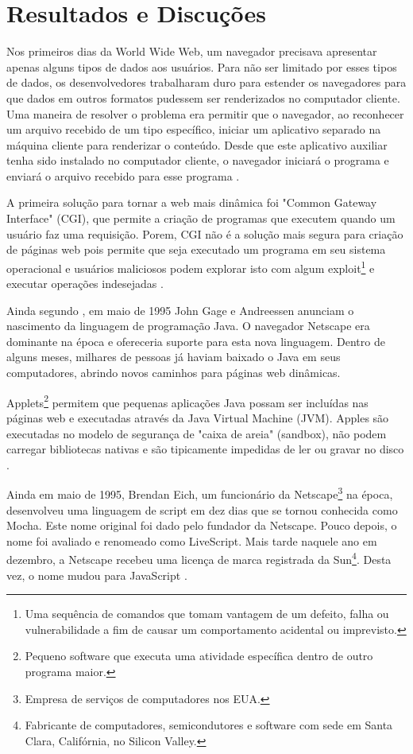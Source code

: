 \section{Resultados e Discuções}



Nos primeiros dias da World Wide Web, um navegador precisava apresentar apenas alguns tipos de dados aos usuários. Para não ser limitado por esses tipos de dados, os desenvolvedores trabalharam duro para estender os navegadores para que dados em outros formatos pudessem ser renderizados no computador cliente. Uma maneira de resolver o problema era permitir que o navegador, ao reconhecer um arquivo recebido de um tipo específico, iniciar um aplicativo separado na máquina cliente para renderizar o conteúdo. Desde que este aplicativo auxiliar tenha sido instalado no computador cliente, o navegador iniciará o programa e enviará o arquivo recebido para esse programa \citep{zammetti2007brief}.

A primeira solução para tornar a web mais dinâmica foi "Common Gateway Interface" (CGI), que permite a criação de programas que executem quando um usuário faz uma requisição. Porem, CGI não é a solução mais segura para criação de páginas web pois permite que seja executado um programa em seu sistema operacional e usuários maliciosos podem explorar isto com algum exploit\footnote{Uma sequência de comandos que tomam vantagem de um defeito, falha ou vulnerabilidade a fim de causar um comportamento acidental ou imprevisto.} e executar operações indesejadas \citep{Asleson2006}.

Ainda segundo \citet{Asleson2006}, em maio de 1995 John Gage e Andreessen anunciam o nascimento da linguagem de programação Java. O navegador Netscape era dominante na época e ofereceria suporte para esta nova linguagem. Dentro de alguns meses, milhares de pessoas já haviam baixado o Java em seus computadores, abrindo novos caminhos para páginas web dinâmicas.

Applets\footnote{Pequeno software que executa uma atividade específica dentro de outro programa maior.} permitem que pequenas aplicações Java possam ser incluídas nas páginas web e executadas através da Java Virtual Machine (JVM). Apples são executadas no modelo de segurança de "caixa de areia" (sandbox), não podem carregar bibliotecas nativas e são tipicamente impedidas de ler ou gravar no disco \citep{Asleson2006}.

Ainda em maio de 1995, Brendan Eich, um funcionário da Netscape\footnote{Empresa de serviços de computadores nos EUA.} na época, desenvolveu uma linguagem de script em dez dias que se tornou conhecida como Mocha. Este nome original foi dado pelo fundador da Netscape. Pouco depois, o nome foi avaliado e renomeado como LiveScript. Mais tarde naquele ano em dezembro, a Netscape recebeu uma licença de marca registrada da Sun\footnote{Fabricante de computadores, semicondutores e software com sede em Santa Clara, Califórnia, no Silicon Valley.}. Desta vez, o nome mudou para JavaScript \citep{neer2013history}.


